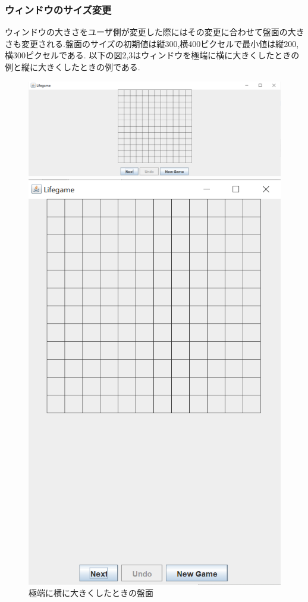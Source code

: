 \documentclass[dvipdfmx]{jarticle}
\begin{document}
\subsubsection{ウィンドウのサイズ変更}
ウィンドウの大きさをユーザ側が変更した際にはその変更に合わせて盤面の大きさも変更される.盤面のサイズの初期値は縦300,横400ピクセルで最小値は縦200,横300ピクセルである.
以下の図2,3はウィンドウを極端に横に大きくしたときの例と縦に大きくしたときの例である.
\begin{figure}[htbp]
    \begin{minipage}[b]{0.45\linewidth}
      \centering
      \includegraphics[keepaspectratio, scale=0.3]{wide.png}
      \caption{極端に横に大きくしたときの盤面}
    \end{minipage}
    \begin{minipage}[b]{0.45\linewidth}
      \centering
      \includegraphics[keepaspectratio, scale=0.3]{height.png}

\end{minipage}
\end{figure}
\end{document}
